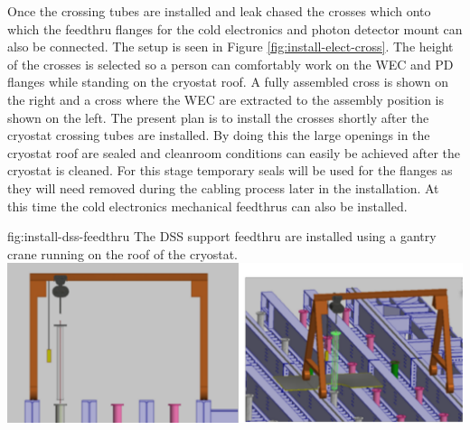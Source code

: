 Once the crossing tubes are installed and leak chased the crosses which onto which the feedthru flanges for the cold electronics and photon detector mount can also be connected. The setup is seen in Figure \ref{fig:install-elect-cross}. 
The height of the crosses is selected so a person can comfortably work on the WEC and PD flanges while standing on the cryostat roof. 
A fully assembled cross is shown on the right and a cross where the WEC are extracted to the assembly position is shown on the left. 
The present plan is to install the crosses shortly after the cryostat crossing tubes are installed. 
By doing this the large openings in the cryostat roof are sealed and cleanroom conditions can easily be achieved after the cryostat is cleaned. 
For this stage temporary seals will be used for the flanges as they will need removed during the cabling process later in the installation. At this time the cold electronics mechanical feedthrus can also be installed. 

\begin{dunefigure}{fig:install-dss-feedthru}
  {The DSS support feedthru are installed using a gantry crane running on the roof of the cryostat.}
 \includegraphics[width=.95\textwidth]{graphics/dss-feedthru-install.pdf}
\end{dunefigure}

